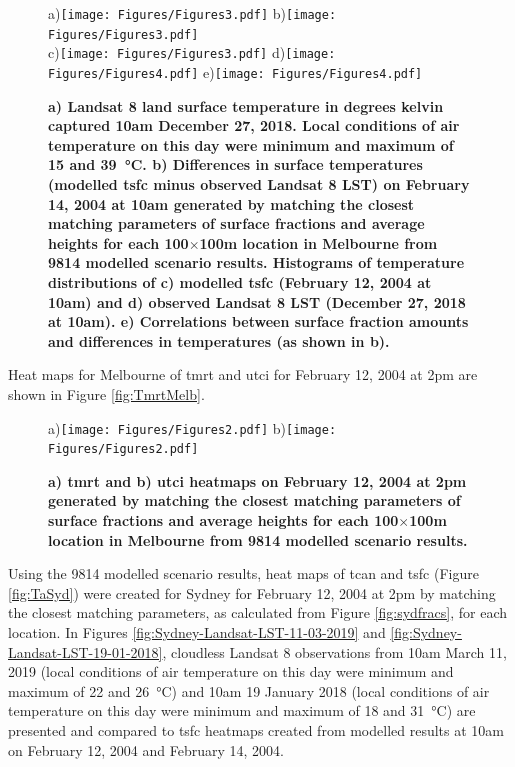 \documentclass[final,3p,times,authoryear]{elsarticle}
\begin{document}
\begin{figure}
\centering
a)\texttt{[image: Figures/Figures3.pdf]}
b)\texttt{[image: Figures/Figures3.pdf]}\\
c)\texttt{[image: Figures/Figures3.pdf]}
d)\texttt{[image: Figures/Figures4.pdf]}
e)\texttt{[image: Figures/Figures4.pdf]}
\caption{\bf a) Landsat 8 land surface temperature in degrees kelvin captured 10am December 27, 2018. Local conditions of air temperature on this day were minimum and maximum of 15 and 39\SI{}{\degreeCelsius}. b) Differences in surface temperatures (modelled \gls{tsfc} minus observed Landsat 8 LST) on February 14, 2004 at 10am generated by matching the closest matching parameters of surface fractions and average heights for each 100$\times$100m location in Melbourne from 9814 modelled scenario results. Histograms of temperature distributions of c) modelled \gls{tsfc} (February 12, 2004 at 10am) and d) observed Landsat 8 LST (December 27, 2018 at 10am). e) Correlations between surface fraction amounts and differences in temperatures (as shown in b).}
 \label{fig:Melb_TSFC14_85}
\end{figure}



Heat maps for Melbourne of \gls{tmrt} and \gls{utci} for February 12, 2004 at 2pm are shown in Figure \ref{fig:TmrtMelb}.


\begin{figure}
\centering
a)\texttt{[image: Figures/Figures2.pdf]}
b)\texttt{[image: Figures/Figures2.pdf]}
\caption{\bf a) \gls{tmrt} and b) \gls{utci} heatmaps on February 12, 2004 at 2pm generated by matching the closest matching parameters of surface fractions and average heights for each 100$\times$100m location in Melbourne from 9814 modelled scenario results.  }
 \label{fig:TmrtMelb}
 \label{fig:utciMelb}
\end{figure}


Using the 9814 modelled scenario results, heat maps of \gls{tcan} and \gls{tsfc} (Figure \ref{fig:TaSyd}) were created for Sydney for February 12, 2004 at 2pm by matching the closest matching parameters, as calculated from Figure \ref{fig:sydfracs}, for each location. In Figures \ref{fig:Sydney-Landsat-LST-11-03-2019} and \ref{fig:Sydney-Landsat-LST-19-01-2018}, cloudless Landsat 8 observations from 10am March 11, 2019 (local conditions of air temperature on this day were minimum and maximum of 22 and 26\SI{}{\degreeCelsius}) and 10am 19 January 2018 (local conditions of air temperature on this day were minimum and maximum of 18 and 31\SI{}{\degreeCelsius}) are presented and compared to \gls{tsfc} heatmaps created from modelled results at 10am on February 12, 2004 and February 14, 2004. 
\end{document}
